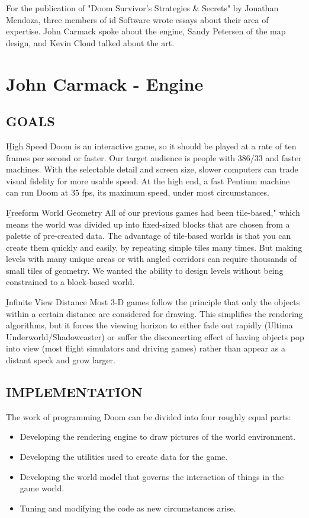 For the publication of "Doom Survivor's Strategies \& Secrets" by Jonathan Mendoza, three members of id Software wrote essays about their area of expertise. John Carmack spoke about the engine, Sandy Petersen of the map design, and Kevin Cloud talked about the art.\\
\par
\section{John Carmack - Engine}
\subsection{GOALS}
\b{High Speed} Doom is an interactive game, so it should be played at a rate of ten frames per second or faster. Our target audience is people with 386/33 and faster machines. With the selectable detail and screen size, slower computers can trade visual fidelity for more usable speed. At the high end, a fast Pentium machine can run Doom at 35 fps, its maximum speed, under most circumstances.\\
\par

\b{Freeform World Geometry} All of our previous games had been tile-based," which means the world was divided up into fixed-sized blocks that are chosen from a palette of pre-created data. The advantage of tile-based worlds is that you can create them quickly and easily, by repeating simple tiles many times. But making levels with many unique areas or with angled corridors can require thousands of small tiles of geometry. We wanted the ability to design levels without being constrained to a block-based world.\\
\par 
\b{Infinite View Distance} Most 3-D games
follow the principle that only the objects within a certain distance are considered for drawing.
This simplifies the rendering algorithms, but it forces the viewing horizon to either fade out rapidly (Ultima Underworld/Shadowcaster) or suffer the disconcerting effect of having objects pop into view (most flight simulators and driving games) rather than appear as a distant speck and grow larger.
\par
\subsection{IMPLEMENTATION}
The work of programming Doom can be divided into four roughly
equal parts:
\begin{itemize}
\item Developing the rendering engine
to draw pictures
of the world
environment.
\item Developing the utilities used to create data for the game.
\item Developing the world model that governs
the interaction of
things in the game world.
\item Tuning and modifying
the code as new circumstances arise.
\end{itemize}

